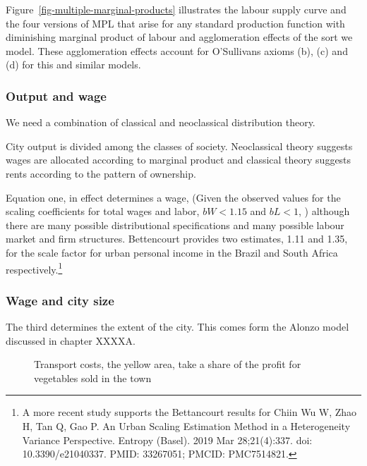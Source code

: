  
% 

Figure~\ref{fig-multiple-marginal-products} illustrates the labour supply curve and the four versions of MPL that arise for any standard production function with diminishing marginal product of labour and agglomeration effects of the sort we model. These agglomeration effects account for O'Sullivans axioms (b), (c) and (d) for this and similar models. 

\color{black}
 
\subsubsection{Output and wage}
We need a combination of classical and neoclassical distribution theory.

City output is divided among the classes of society. Neoclassical theory suggests wages are allocated according to marginal product and classical theory suggests rents according to the pattern of ownership.

Equation one, in effect determines a wage, (Given the observed values for the scaling coefficients for total wages and labor, $bW < 1.15$ and $bL < 1$, )  although there are many possible distributional specifications and many possible labour market and firm structures. Bettencourt provides two  estimates,  1.11 and 1.35, for the scale factor for urban personal income in the Brazil and South Africa respectively.\footnote{A more recent  study supports the Bettancourt results for Chiin Wu W, Zhao H, Tan Q, Gao P. An Urban Scaling Estimation Method in a Heterogeneity Variance Perspective. Entropy (Basel). 2019 Mar 28;21(4):337. doi: 10.3390/e21040337. PMID: 33267051; PMCID: PMC7514821.} 

\subsubsection{Wage and city size}
The third determines the extent of the city. This comes form the Alonzo model discussed in chapter XXXXA. 

\begin{figure}
    \begin{center}
    
    \caption{Transport costs, the yellow area, take a share of the profit for vegetables sold in the town}
    \end{center}
\end{figure}

